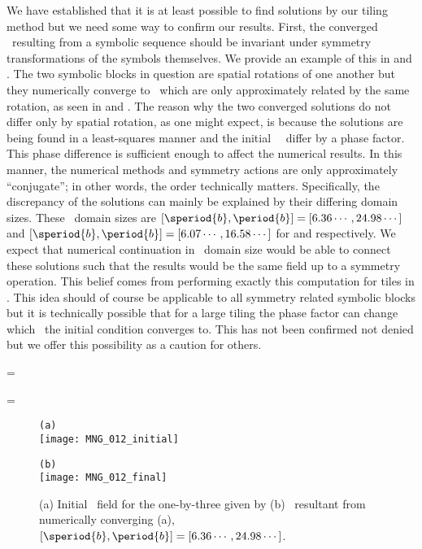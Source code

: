 We have established that it is at least possible to find solutions
by our tiling method but we need some way to confirm our results.
First, the converged \twot\ resulting from a symbolic sequence should
be invariant under symmetry transformations of the symbols themselves.
We provide an example of this
in  and .
The two symbolic blocks in question are spatial rotations
of one another but they
numerically converge to \twots\ which are only approximately
related by the same rotation, as seen in  and
. The reason why the two converged solutions
do not differ only by spatial rotation, as one might
expect, is because the solutions are being found in a least-squares
manner and the initial \spt\ \Fcs\ differ by a phase factor.
This phase difference is sufficient enough to affect the numerical results.
In this manner, the numerical methods and symmetry actions are only
approximately ``conjugate''; in other words, the order technically matters.
Specifically, the discrepancy of the solutions can mainly be explained
by their differing domain sizes. These \spt\ domain sizes are
$[\speriod{b},\period{b}]=[6.36\cdots,24.98\cdots]$ and
$[\speriod{b},\period{b}]=[6.07\cdots,16.58\cdots]$ for 
and  respectively. We expect that numerical continuation
in \spt\ domain size would be able to connect these solutions such
that the results would be the same field up to a symmetry operation. This
belief comes from performing exactly this computation for tiles in .
This idea should of course be applicable to all symmetry related symbolic blocks
but it is technically possible that for a large tiling the phase factor can change
which \twot\ the initial condition converges to. This has not been confirmed not
denied but we offer this possibility as a caution for others.

\beq
\Mm=\left[\begin{array}{c}
0\,1\,2
\end{array}\right]

\beq
\Mm=\left[\begin{array}{c}
2\,0\,1
\end{array}\right]


\begin{figure}
\begin{minipage}[height=.4\textheight]{.5\textwidth}
\centering \small{\texttt{(a)}}\\
\texttt{[image: MNG\_012\_initial]}
\end{minipage}
\begin{minipage}[height=.4\textheight]{.5\textwidth}
\centering \small{\texttt{(b)}}\\
\texttt{[image: MNG\_012\_final]}
\end{minipage}
\caption{ \label{fig:block012}
(a) Initial \spt\ field for the one-by-three given by 
(b) \twoT\ resultant from numerically converging (a),
$[\speriod{b},\period{b}]=[6.36\cdots,24.98\cdots]$.
}
\end{figure}

